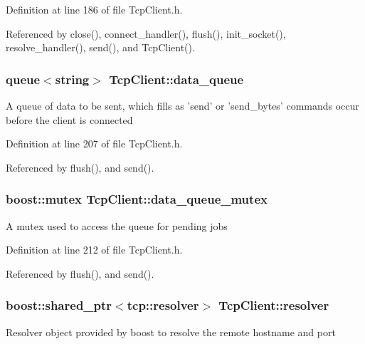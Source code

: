 Definition at line 186 of file TcpClient.h.



Referenced by close(), connect\_\-handler(), flush(), init\_\-socket(), resolve\_\-handler(), send(), and TcpClient().

\hypertarget{classTcpClient_a1ed777da769d6f064d9f908adabf2284}{
\subsubsection[{data\_\-queue}]{\setlength{\rightskip}{0pt plus 5cm}queue$<$string$>$ {\bf TcpClient::data\_\-queue}}}
\label{classTcpClient_a1ed777da769d6f064d9f908adabf2284}
A queue of data to be sent, which fills as 'send' or 'send\_\-bytes' commands occur before the client is connected 

Definition at line 207 of file TcpClient.h.



Referenced by flush(), and send().

\hypertarget{classTcpClient_a158c145cba5559a4e728772b044fbbb8}{
\subsubsection[{data\_\-queue\_\-mutex}]{\setlength{\rightskip}{0pt plus 5cm}boost::mutex {\bf TcpClient::data\_\-queue\_\-mutex}}}
\label{classTcpClient_a158c145cba5559a4e728772b044fbbb8}
A mutex used to access the queue for pending jobs 

Definition at line 212 of file TcpClient.h.



Referenced by flush(), and send().

\hypertarget{classTcpClient_af3244fcf0139e5a07bd7b85f3e7bb6c9}{
\subsubsection[{resolver}]{\setlength{\rightskip}{0pt plus 5cm}boost::shared\_\-ptr$<$tcp::resolver$>$ {\bf TcpClient::resolver}}}
\label{classTcpClient_af3244fcf0139e5a07bd7b85f3e7bb6c9}
Resolver object provided by {\ttfamily boost} to resolve the remote hostname and port 

